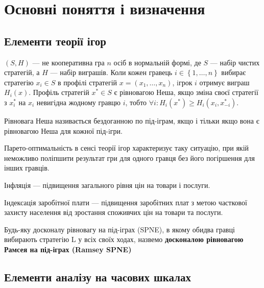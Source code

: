 \section{Основні поняття і визначення}
\subsection{Елементи теорії ігор}

\begin{definition}
	$(S,H)$ --- не кооперативна гра $n$ осіб в нормальній
	формі, де $S$ --- набір чистих стратегій, а $H$ --- набір виграшів. Коли кожен гравець $i \in \left\{1,\dots,n\right\}$ вибирає стратегію $x_i
	\in S$ в профілі стратегій $x=(x_1,\dots,x_n)$, iгрок $i$ отримує
	виграш $H_i(x)$. Профіль стратегій $x^* \in S$ є рівновагою
	Неша, якщо зміна своєї стратегії з $x_i^*$  на $x_i$ невигідна жодному гравцю  $i$, тобто $\forall i : H_i(x^*) \geqslant H_i(x_i,
	x_{-i}^*)$.
\end{definition}
	
\begin{definition}
Рівновага Неша називається бездоганною по під-іграм, якщо і тільки якщо вона
є рівновагою Неша для кожної під-iгри.
\end{definition}

\begin{definition}
Парето-оптимальність в сенсі теорії ігор характеризує таку ситуацію, при якій неможливо поліпшити результат гри для одного гравця без його погіршення для інших гравців.
\end{definition}

\begin{definition}
Інфляція --- підвищення загального рівня цін на товари і послуги.
\end{definition}

\begin{definition}
Індексація заробітної плати --- підвищення заробітних плат з метою часткової захисту населення від зростання споживчих цін на товари та послуги.\end{definition}

\begin{definition}
	Будь-яку досконалу рівновагу на під-іграх (SPNE), 
	 в якому обидва гравці вибирають стратегію L у всіх своїх ходах, назвемо \textbf {досконалою рівновагою Рамсея на під-іграх (Ramsey SPNE)}~\cite{libich2008macroeconomic}
\end{definition}

\subsection{Елементи аналізу на часових шкалах}

